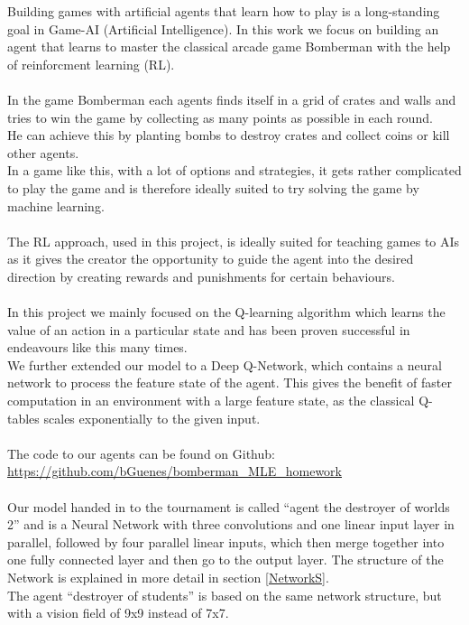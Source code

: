 
Building games with artificial agents that learn how to play is a long-standing goal in Game-AI (Artificial Intelligence). In this work we focus on building an agent that learns to master the classical arcade game Bomberman with the help of reinforcment learning (RL).\\ \\
In the game Bomberman each agents finds itself in a grid of crates and walls and tries to win the game by collecting as many points as possible in each round.\\
He can achieve this by planting bombs to destroy crates and collect coins or kill other agents. \\
In a game like this, with a lot of options and strategies, it gets rather complicated to play the game and is therefore ideally suited to try solving the game by machine learning.\\ \\
The RL approach, used in this project, is ideally suited for teaching games to AIs as it gives the creator the opportunity to guide the agent into the desired direction by creating rewards and punishments for certain behaviours.\\ \\
In this project we mainly focused on the Q-learning algorithm which learns the value of an action in a particular state and has been proven successful in endeavours like this many times. \\
We further extended our model to a Deep Q-Network, which contains a neural network to process the feature state of the agent. This gives the benefit of faster computation in an environment with a large feature state, as the classical Q-tables scales exponentially to the given input.\\ \\
The code to our agents can be found on Github: \\
\url{https://github.com/bGuenes/bomberman_MLE_homework} \\ \\
Our model handed in to the tournament is called ``agent the destroyer of worlds 2'' and is a Neural Network with three convolutions and one linear input layer in parallel, followed by four parallel linear inputs, which then merge together into one fully connected layer and then go to the output layer. The structure of the Network is explained in more detail in section \ref{NetworkS}. \\
The agent ``destroyer of students'' is based on the same network structure, but with a vision field of 9x9 instead of 7x7.\\

